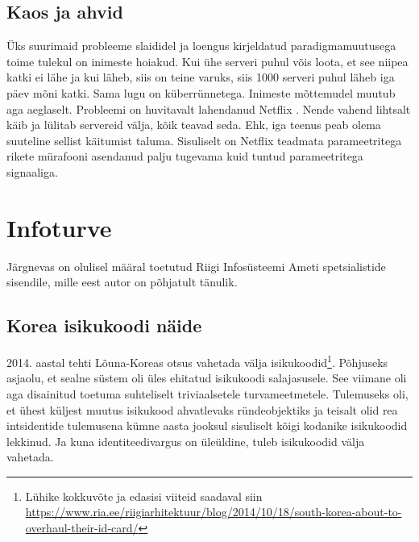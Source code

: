 \documentclass{article}
\begin{document}
\subsection{Kaos ja ahvid}
Üks suurimaid probleeme slaididel ja loengus kirjeldatud paradigmamuutusega toime tulekul on inimeste hoiakud. Kui ühe serveri puhul võis loota, et see niipea katki ei lähe ja kui läheb, siis on teine varuks, siis 1000 serveri puhul läheb iga päev mõni katki. Sama lugu on küberrünnetega. Inimeste mõttemudel muutub aga aeglaselt. Probleemi on huvitavalt lahendanud Netflix \citep{monkey}. Nende vahend lihtsalt käib ja lülitab servereid välja, kõik teavad seda. Ehk, iga teenus peab olema suuteline sellist käitumist taluma. Sisuliselt on Netflix teadmata parameetritega rikete mürafooni asendanud palju tugevama kuid tuntud parameetritega signaaliga.   

\section{Infoturve}
Järgnevas on olulisel määral toetutud Riigi Infosüsteemi Ameti spetsialistide sisendile, mille eest autor on põhjatult tänulik.

\subsection{Korea isikukoodi näide}
2014. aastal tehti Lõuna-Koreas otsus vahetada välja isikukoodid\footnote{Lühike kokkuvõte ja edasisi viiteid saadaval siin \url{https://www.ria.ee/riigiarhitektuur/blog/2014/10/18/south-korea-about-to-overhaul-their-id-card/}}. Põhjuseks asjaolu, et sealne süstem oli üles ehitatud isikukoodi salajasusele. See viimane oli aga disainitud toetuma suhteliselt triviaalsetele turvameetmetele. Tulemuseks oli, et ühest küljest muutus isikukood ahvatlevaks ründeobjektiks ja teisalt olid rea intsidentide tulemusena kümne aasta jooksul sisuliselt kõigi kodanike isikukoodid lekkinud. Ja kuna identiteedivargus on üleüldine, tuleb isikukoodid välja vahetada.
\end{document}

